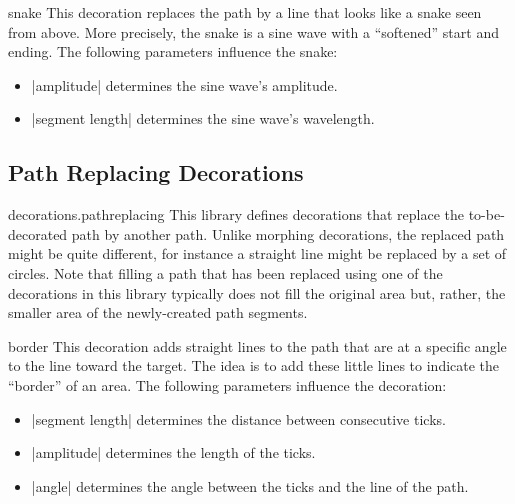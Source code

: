 \begin{decoration}{snake}
  This decoration replaces the path by a line that looks like a snake
  seen from above. More precisely, the snake is a sine wave with a
  ``softened'' start and ending. The following parameters influence
  the snake:
  \begin{itemize}
  \item |amplitude|
    determines the sine wave's amplitude.
  \item |segment length|
    determines the sine wave's wavelength.
  \end{itemize}
\begin{codeexample}[]
\end{codeexample}
\end{decoration}




\subsection{Path Replacing Decorations}

\begin{pgflibrary}{decorations.pathreplacing}
  This library defines decorations that replace the to-be-decorated
  path by another path. Unlike morphing decorations, the replaced path
  might be quite different, for instance a straight line might be
  replaced by a set of circles. Note that filling a path that has been
  replaced using one of the decorations in this library typically does
  not fill the original area but, rather, the smaller area of the
  newly-created path segments.
\end{pgflibrary}

\begin{decoration}{border}
  This decoration adds straight lines to the path that are at a specific
  angle to the line toward the target. The idea is to add these little
  lines to indicate the ``border'' of an area. The following
  parameters influence the decoration:
  \begin{itemize}
  \item |segment length|
    determines the distance between consecutive ticks.
  \item |amplitude|
    determines the length of the ticks.
  \item |angle|
    determines the angle between the ticks and the line of the path.
  \end{itemize}
\begin{codeexample}[]
\end{codeexample}
\end{decoration}


